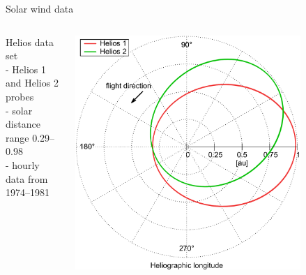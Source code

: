 \begin{frame}[plain,c]{Solar wind data}{}
	\begin{columns}[c]
		
		Helios data set \citep{Rosenbauer1977}\\
		- Helios 1 and Helios 2 probes\\
		- solar distance range \SIrange{0.29}{0.98}{\au}\\
		- hourly data from 1974--1981\\\ 
		
		\includegraphics[width=0.8\textwidth]{../talk_figures/Helios12_orbits_ecliptic.png}
		

		

\end{columns}
\end{frame}
